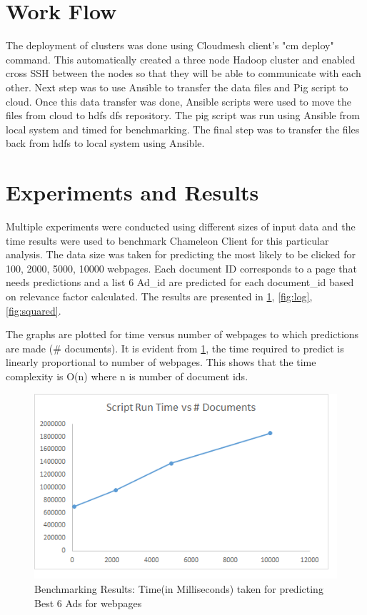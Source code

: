 \documentclass[9pt,twocolumn,twoside]{../../styles/osajnl}
\begin{document}
\section{Work Flow}

The deployment of clusters was done using Cloudmesh client's "cm deploy" command. This automatically created a three node Hadoop cluster and enabled cross SSH between the nodes so that they will be able to communicate with each other. Next step was to use Ansible to transfer the data files and Pig script to cloud. Once this data transfer was done, Ansible scripts were used to move the files from cloud to hdfs dfs repository. The pig script was run using Ansible from local system and timed for benchmarking. The final step was to transfer the files back from hdfs to local system using Ansible.

\section{Experiments and Results}
Multiple experiments were conducted using different sizes of input data and the time results were used to benchmark Chameleon Client for this particular analysis. The data size was taken for predicting the most likely to be clicked for 100, 2000, 5000, 10000 webpages. Each document ID corresponds to a page that needs predictions and a list 6 Ad\_id are predicted for each document\_id based on relevance factor calculated.
The results are presented in  \ref{fig:regular}, \ref{fig:log}, \ref{fig:squared}.  

The graphs are plotted for time versus number of webpages to which predictions are made (\# documents). It is evident from \ref{fig:regular}, the time required to predict is linearly proportional to number of webpages. This shows that the time complexity is O(n) where n is number of document ids.


\begin{figure}[hptb]
\centering
\includegraphics[width=\linewidth]{images/regular.png}
\caption{ Benchmarking Results: Time(in Milliseconds) taken for predicting Best 6 Ads for webpages}
\label{fig:regular}
\end{figure}
\end{document}
